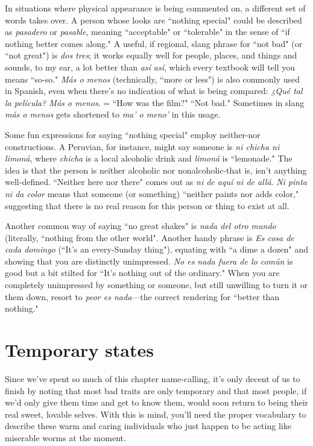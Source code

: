 In situations where physical appearance is being commented
on, a different set of words takes over. A person whose looks are ``nothing special" could be described as \emph{pasadero} or \emph{pasable}, meaning ``acceptable" or ``tolerable" in the sense of ``if nothing better comes
along." A useful, if regional, slang phrase for ``not bad" (or ``not great")
is \emph{dos tres}; it works equally well for people, places, and things and
sounds, to my ear, a lot better than \emph{así así}, which every textbook will
tell you means ``so-so." \emph{Más o menos} (technically, ``more or less") is
also commonly used in Spanish, even when there's no indication of
what is being compared: \emph{¿Qué tal la película? Más o menos}. = ``How
was the film?" ``Not bad." Sometimes in slang \emph{más o menos} gets
shortened to \emph{ma' o meno'} in this usage.

Some fun expressions for saying ``nothing special" employ neither-nor constructions. A Peruvian, for instance, might say someone is
\emph{ni chicha ni limoná}, where \emph{chicha} is a local alcoholic drink and \emph{limoná} is ``lemonade." The idea is that the person is neither alcoholic
nor nonalcoholic-that is, isn't anything well-defined. ``Neither here
nor there" comes out as \emph{ni de aquí ni de allá}. \emph{Ni pinta ni da color}
means that someone (or something) ``neither paints nor adds color,"
suggesting that there is no real reason for this person or thing to exist
at all.

Another common way of saying ``no great shakes" is \emph{nada del
otro mundo} (literally, ``nothing from the other world". Another handy
phrase is \emph{Es cosa de cada domingo} (``It's an every-Sunday thing"),
equating with ``a dime a dozen" and showing that you are distinctly
unimpressed. \emph{No es nada fuera de lo común} is good but a bit stilted
for ``It's nothing out of the ordinary." When you are completely unimpressed by something or someone, but still unwilling to turn it or
them down, resort to \emph{peor es nada}---the correct rendering for ``better
than nothing."

\section{Temporary states}

Since we've spent so much of this chapter name-calling, it's
only decent of us to finish by noting that most bad traits are only
temporary and that most people, if we'd only give them time and get
to know them, would soon return to being their real sweet, lovable
selves. With this is mind, you'll need the proper vocabulary to describe
these warm and caring individuals who just happen to be acting like
miserable worms at the moment.

